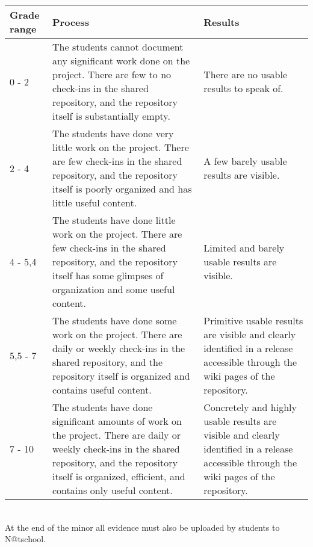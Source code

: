 		\begin{tabular}{| l | p{6.5cm} | p{6.5cm} |}
			\hline
			Grade range & Process & Results \\
			\hline
			0 - 2 & The students cannot document any significant work done on the project. There are few to no check-ins in the shared repository, and the repository itself is substantially empty. & There are no usable results to speak of. \\
			\hline
			2 - 4 & The students have done very little work on the project. There are few check-ins in the shared repository, and the repository itself is poorly organized and has little useful content. & A few barely usable results are visible. \\			
			\hline
			4 - 5,4 & The students have done little work on the project. There are few check-ins in the shared repository, and the repository itself has some glimpses of organization and some useful content. & Limited and barely usable results are visible. \\
			\hline
			5,5 - 7 & The students have done some work on the project. There are daily or weekly check-ins in the shared repository, and the repository itself is organized and contains useful content. & Primitive usable results are visible and clearly identified in a release accessible through the wiki pages of the repository. \\
			\hline
			7 - 10 & The students have done significant amounts of work on the project. There are daily or weekly check-ins in the shared repository, and the repository itself is organized, efficient, and contains only useful content. & Concretely and highly usable results are visible and clearly identified in a release accessible through the wiki pages of the repository. \\
			\hline
		\end{tabular} \\

		At the end of the minor all evidence must also be uploaded by students to N@tschool.
		